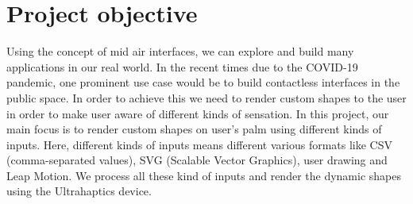\section{Project objective}
\label{sec:intro:objective}

Using the concept of mid air interfaces, we can explore and build many applications in our real world. In the recent times due to the COVID-19 pandemic, one prominent use case would be to build contactless interfaces in the public space. In order to achieve this we need to render custom shapes to the user in order to make user aware of different kinds of sensation.
In this project, our main focus is to render custom shapes on user's palm using different kinds of inputs. Here, different kinds of inputs means different various formats like CSV (comma-separated values), SVG (Scalable Vector Graphics), user drawing and Leap Motion. We process all these kind of inputs and render the dynamic shapes using the Ultrahaptics device. 

